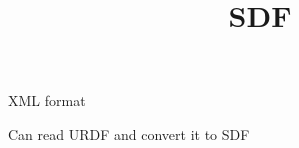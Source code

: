 \documentclass[a4paper]{article}
\title{SDF}
\date{}
\begin{document}
    \maketitle
    XML format
    
    Can read URDF and convert it to SDF
\end{document}
